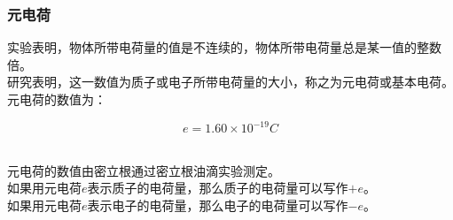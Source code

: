 \documentclass[UTF8]{ctexart}
\begin{document}
\subsubsection{元电荷}
    实验表明，物体所带电荷量的值是不连续的，物体所带电荷量总是某一值的整数倍。\\[3mm]
    研究表明，这一数值为质子或电子所带电荷量的大小，称之为元电荷或基本电荷。\\[3mm]
    元电荷的数值为：
    \begin{large}
        \begin{equation*}
            e=1.60\times 10^{-19}\si{C}
        \end{equation*}
    \end{large}\\
    元电荷的数值由密立根通过密立根油滴实验测定。\\[3mm]
    如果用元电荷$e$表示质子的电荷量，那么质子的电荷量可以写作$+e$。\\[3mm]
    如果用元电荷$e$表示电子的电荷量，那么电子的电荷量可以写作$-e$。

\newpage
\end{document}
